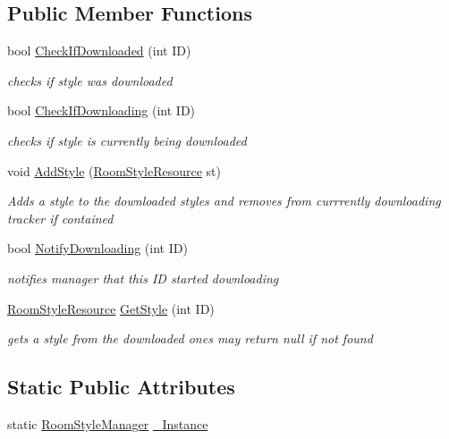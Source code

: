 \subsection*{Public Member Functions}
\begin{DoxyCompactItemize}
\item 
bool \mbox{\hyperlink{class_room_style_manager_a4cc11d2cbbe1a94def12775722d64b74}{Check\+If\+Downloaded}} (int ID)
\begin{DoxyCompactList}\small\item\em checks if style was downloaded \end{DoxyCompactList}\item 
bool \mbox{\hyperlink{class_room_style_manager_aab9bdbc810904cb623cddcb636165a6a}{Check\+If\+Downloading}} (int ID)
\begin{DoxyCompactList}\small\item\em checks if style is currently being downloaded \end{DoxyCompactList}\item 
void \mbox{\hyperlink{class_room_style_manager_a2b0802f24ffe1c2cb4db101359c6bf5e}{Add\+Style}} (\mbox{\hyperlink{class_room_style_resource}{Room\+Style\+Resource}} st)
\begin{DoxyCompactList}\small\item\em Adds a style to the downloaded styles and removes from currrently downloading tracker if contained \end{DoxyCompactList}\item 
bool \mbox{\hyperlink{class_room_style_manager_a3d3f5a2cb6e861577d01b015c30c3d9a}{Notify\+Downloading}} (int ID)
\begin{DoxyCompactList}\small\item\em notifies manager that this ID started downloading \end{DoxyCompactList}\item 
\mbox{\hyperlink{class_room_style_resource}{Room\+Style\+Resource}} \mbox{\hyperlink{class_room_style_manager_acc946bc24833e24565dee0cdc3b2ef44}{Get\+Style}} (int ID)
\begin{DoxyCompactList}\small\item\em gets a style from the downloaded ones may return null if not found \end{DoxyCompactList}\end{DoxyCompactItemize}
\subsection*{Static Public Attributes}
\begin{DoxyCompactItemize}
\item 
static \mbox{\hyperlink{class_room_style_manager}{Room\+Style\+Manager}} \mbox{\hyperlink{class_room_style_manager_a1f3eb1f4b0e619fa59fc1584ef21a6c3}{\+\_\+\+Instance}}
\end{DoxyCompactItemize}
